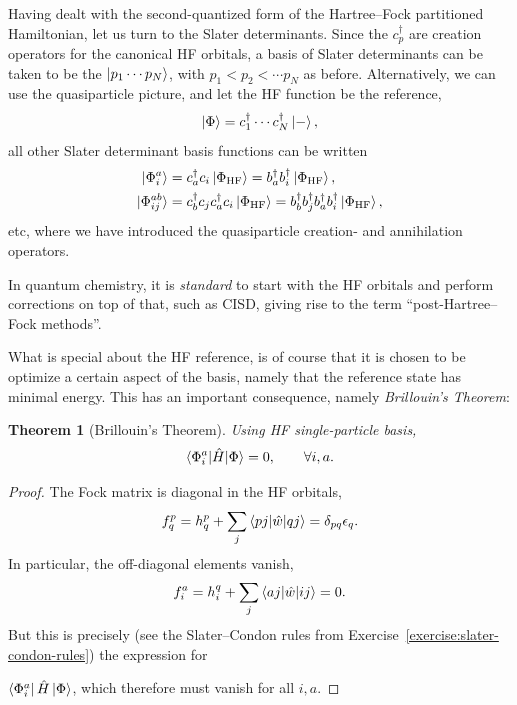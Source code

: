 \documentclass{report}
\theoremstyle{plain}
\newtheorem{theorem}{Theorem}[chapter]
\theoremstyle{definition}
\begin{document}
Having dealt with the second-quantized form of the Hartree--Fock
partitioned Hamiltonian, let us turn to the Slater determinants. Since
the $c^\dag_p$ are creation operators for the canonical HF orbitals, a
basis of Slater determinants can be taken to be the $\ket{p_1\cdots
  p_N}$, with $p_1<p_2<\cdots p_N$ as before. Alternatively, we can
use the quasiparticle picture, and let the HF function be the
reference,
\begin{equation}
  \ket{\Phi} = c^\dag_1\cdots c^\dag_N \ket{-},
\end{equation}
all other Slater determinant basis functions can be written
\begin{align}
  \ket{\Phi_i^a} &= c^\dag_a c_i \ket{\Phi_\text{HF}} = b^\dag_a
  b^\dag_i \ket{\Phi_\text{HF}},\\
  \ket{\Phi_{ij}^{ab}} &= c^\dag_b c_j c^\dag_a c_i
  \ket{\Phi_\text{HF}} = b^\dag_b b^\dag_j b^\dag_a
  b^\dag_i \ket{\Phi_\text{HF}},
\end{align}
etc, where we have introduced the quasiparticle creation- and
annihilation operators. 

In quantum chemistry, it is \emph{standard} to start with the HF
orbitals and perform corrections on top of that, such as CISD, giving
rise to the term ``post-Hartree--Fock methods''.

What is special about the HF reference, is of course that it is chosen
to be optimize a certain aspect of the basis, namely that the
reference state has minimal energy. This has an important consequence,
namely \emph{Brillouin's Theorem}:
\begin{theorem}[Brillouin's Theorem]
  Using HF single-particle basis,
  \begin{equation}
    \braket{\Phi_{i}^a|\hat{H}|\Phi} = 0,\qquad \forall i,a.
  \end{equation}
\end{theorem}
\begin{proof}
  The Fock matrix is diagonal in the HF orbitals,
  \begin{equation}
    f^{p}_q = h^p_q + \sum_j \braket{pj|\hat{w}|qj} = \delta_{pq}\epsilon_q.
  \end{equation}
  In particular, the off-diagonal elements vanish,
  \begin{equation}
    f^{a}_i = h^q_i + \sum_j \braket{aj|\hat{w}|ij} = 0.
  \end{equation}
  But this is precisely (see the Slater--Condon rules from
  Exercise~\ref{exercise:slater-condon-rules}) the expression for 

  $\bra{\Phi_{i}^a}\hat{H}\ket{\Phi}$, which therefore must
  vanish for all $i,a$. 
\end{proof}
\end{document}
